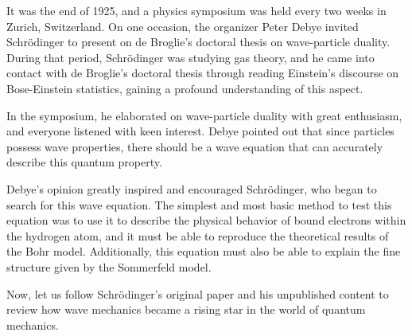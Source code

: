 \documentclass[a4paper, 12pt, oneside, onecolumn]{article}
\begin{document}
\begin{multicols}{2}
It was the end of 1925, and a physics symposium was held every two weeks in Zurich, Switzerland. On one occasion, the organizer Peter Debye invited Schrödinger to present on de Broglie's doctoral thesis on wave-particle duality. During that period, Schrödinger was studying gas theory, and he came into contact with de Broglie's doctoral thesis through reading Einstein's discourse on Bose-Einstein statistics, gaining a profound understanding of this aspect. 

In the symposium, he elaborated on wave-particle duality with great enthusiasm, and everyone listened with keen interest. Debye pointed out that since particles possess wave properties, there should be a wave equation that can accurately describe this quantum property.

Debye's opinion greatly inspired and encouraged Schrödinger, who began to search for this wave equation. The simplest and most basic method to test this equation was to use it to describe the physical behavior of bound electrons within the hydrogen atom, and it must be able to reproduce the theoretical results of the Bohr model. Additionally, this equation must also be able to explain the fine structure given by the Sommerfeld model.

Now, let us follow Schrödinger's\cite{schrodinger2003collected} original paper and his unpublished content to review how wave mechanics became a rising star in the world of quantum mechanics. 


\end{multicols}
\end{document}
